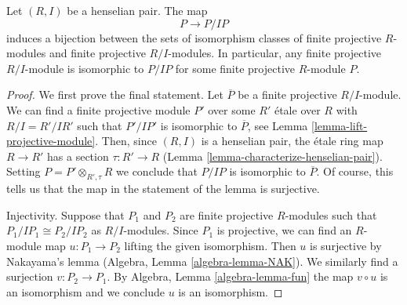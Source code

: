 \begin{lemma}
\label{lemma-lift-finite-projective-module}
Let $(R, I)$ be a henselian pair. The map
$$
P \longrightarrow P/IP
$$
induces a bijection between the sets of isomorphism classes of finite
projective $R$-modules and finite projective $R/I$-modules. In particular,
any finite projective $R/I$-module is isomorphic to $P/IP$
for some finite projective $R$-module $P$.
\end{lemma}

\begin{proof}
We first prove the final statement. Let $\overline{P}$ be a finite
projective $R/I$-module. We can find a finite projective module $P'$
over some $R'$ \'etale over $R$ with $R/I = R'/IR'$ such that
$P'/IP'$ is isomorphic to $\overline{P}$, see
Lemma \ref{lemma-lift-projective-module}.
Then, since $(R, I)$ is a henselian pair, the \'etale ring map $R \to R'$ has
a section $\tau : R' \to R$ (Lemma \ref{lemma-characterize-henselian-pair}).
Setting $P = P' \otimes_{R', \tau} R$ we conclude that $P/IP$
is isomorphic to $\overline{P}$. Of course, this tells us that
the map in the statement of the lemma is surjective.

\medskip\noindent
Injectivity. Suppose that $P_1$ and $P_2$ are finite projective $R$-modules such
that $P_1/IP_1 \cong P_2/IP_2$ as $R/I$-modules. Since $P_1$ is projective,
we can find an $R$-module map $u : P_1 \to P_2$ lifting the given isomorphism.
Then $u$ is surjective by Nakayama's lemma
(Algebra, Lemma \ref{algebra-lemma-NAK}).
We similarly find a surjection $v : P_2 \to P_1$.
By Algebra, Lemma \ref{algebra-lemma-fun} the map $v \circ u$
is an isomorphism and we conclude $u$ is an isomorphism.
\end{proof}
